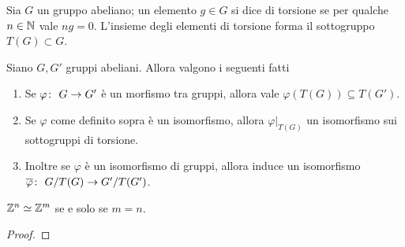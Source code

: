 \begin{definition}
	Sia $G$ un gruppo abeliano; un elemento $g \in G$ si dice di torsione se per qualche $n \in \mathbb{N}$ vale $ng = 0$. L'insieme degli elementi di torsione forma il sottogruppo $T(G) \subset G$.
\end{definition}

\begin{lemma}
	Siano $G, G'$ gruppi abeliani. Allora valgono i seguenti fatti
	\begin{enumerate}
		\item Se $\varphi \colon\ G \rightarrow G'$ è un morfismo tra gruppi, allora vale $\varphi(T(G)) \subseteq T(G')$.
		\item Se $\varphi$ come definito sopra è un isomorfismo, allora $\varphi|_{T(G)}$ un isomorfismo sui sottogruppi di torsione.
		\item Inoltre se $\varphi$ è un isomorfismo di gruppi, allora induce un isomorfismo $\overline{\varphi} \colon\ G/T(G) \rightarrow G'/T(G')$.  
	\end{enumerate}
\end{lemma}

\begin{proposition}
	$\mathbb{Z}^n \simeq \mathbb{Z}^m$ se e solo se $m = n$. 
\end{proposition}
\begin{proof}
\end{proof}

